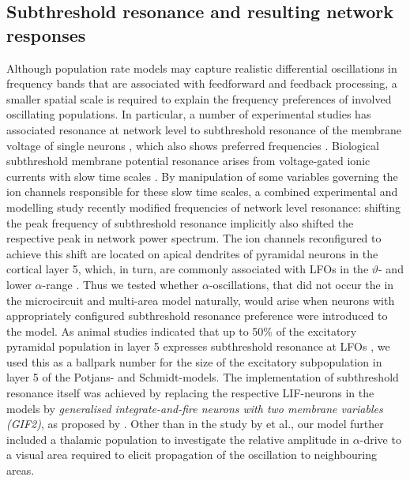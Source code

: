 \subsection{Subthreshold resonance and resulting network responses}
Although population rate models may capture realistic differential oscillations in frequency bands that are associated with feedforward and feedback processing, a smaller spatial scale is required to explain the frequency preferences of involved oscillating populations. 
In particular, a number of experimental studies has associated resonance at network level to subthreshold resonance of the membrane voltage of single neurons \citep{Hutcheon1996a}, which also shows preferred frequencies \citep[for a review see]{Hutcheon2000}. 
Biological subthreshold membrane potential resonance arises from voltage-gated ionic currents with slow time scales \citep{Ulrich2002a,White1995}. 
By manipulation of some variables governing the ion channels responsible for these slow time scales, a combined experimental and modelling study recently modified frequencies of network level resonance: shifting the peak frequency of subthreshold resonance implicitly also shifted the respective peak in network power spectrum\citep[methods]{Chen2016a}.
The ion channels reconfigured to achieve this shift are located on apical dendrites of pyramidal neurons in the cortical layer 5, which, in turn, are commonly associated with LFOs in the $\vartheta$- and lower $\alpha$-range \citep{Schmidt2016,Hutcheon1996}.
Thus we tested whether $\alpha$-oscillations, that did not occur the in the microcircuit \citep{Potjans} and multi-area model \citep{Schmidt2015a} naturally, would arise when neurons with appropriately configured subthreshold resonance preference were introduced to the model.
As animal studies indicated that up to 50\% of the excitatory pyramidal population in layer 5 expresses subthreshold resonance at LFOs \citep{Silva1991}, we used this as a ballpark number for the size of the excitatory subpopulation in layer 5 of the Potjans- and Schmidt-models.
The implementation of subthreshold resonance itself was achieved by replacing the respective LIF-neurons in the models by \textit{generalised integrate-and-fire neurons with two membrane variables (GIF2)}, as proposed by \cite{Richardson2003a}. 
Other than in the study by \citet{Mejias} et al., our model further included a thalamic population to investigate the relative amplitude in $\alpha$-drive to a visual area required to elicit propagation of the oscillation to neighbouring areas.